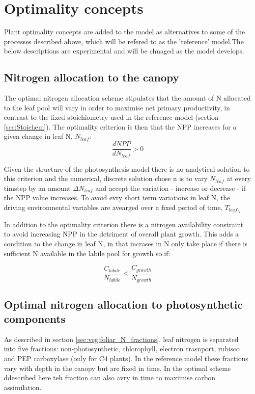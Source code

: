\chapter{Optimality concepts}\label{ch:optimality}

Plant optimality concepts are added to the model as alternatives to some of the processes described above, which will be refered to as the 'reference' model.The below descriptions are experimental and will be chnaged as the model develops.

\section{Nitrogen allocation to the canopy}\label{sec:optimal_n_canopy}
The optimal nitrogen allocation scheme stipulates that the amount of N allocated to the leaf pool will vary in order to maximise net primary productivity, in contrast to the fixed stoichiometry used in the reference model (section \ref{sec:Stoichem}). The optimality criterion is then that the NPP increases for a given change in leaf N, $N_{leaf}$:
\begin{equation}
 \frac{dNPP}{dN_{leaf}}>0
\end{equation}

Given the structure of the photosynthesis model there is no analytical solution to this criterion and the numerical, discrete solution chose n is to vary $N_{leaf}$ at every timstep by an amount ${\Delta}N_{leaf}$ and accept the variation - increase or decrease - if the NPP value increases. To avoid evry short term variations in leaf N, the driving environmental variables are avearged over a fixed period of time, $T_{leaf_N}$

In addition to the optimality criterion there is a nitrogen availability constraint to avoid increasing NPP in the detriment of overall plant growth. This adds a condition to the change in leaf N, in that incrases in N only take place if there is sufficient N available in the labile pool for growth so if:

\begin{equation}
 \frac{C_{labile}}{N_{labile}} < \frac{C_{growth}}{N_{growth}}
\end{equation}


\section{Optimal nitrogen allocation to photosynthetic components}\label{sec:optimal_N_frac}
As described in section \ref{sec:veg:foliar_N_fractions}, leaf nitrogen is separated into five fractions: non-photosynthetic, chlorophyll, electron trasnport, rubisco and PEP carboxylase (only for C4 plants). In the reference model these fractions vary with depth in the canopy but are fixed in time. In the optimal scheme ddescribed here teh fraction can also avry in time to maximise carbon assimilation.

